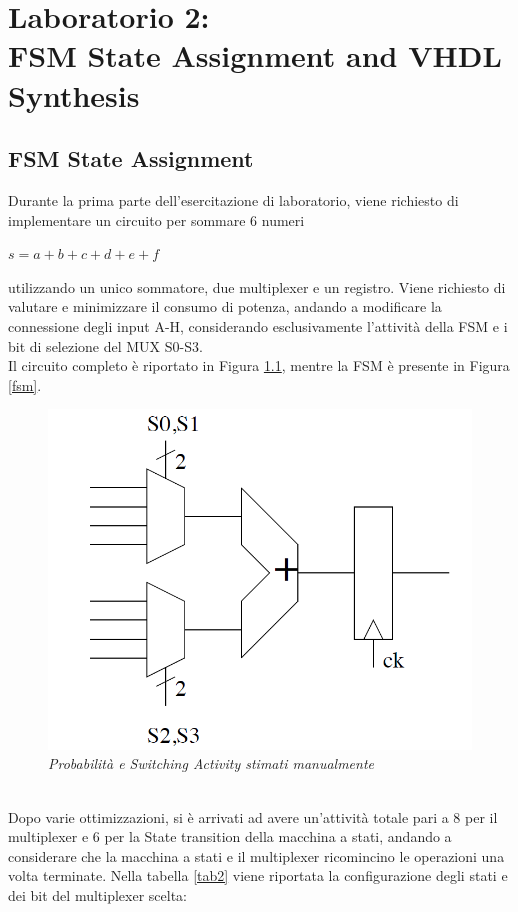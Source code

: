 \chapter{Laboratorio 2: \\FSM State Assignment and VHDL Synthesis}
\section{FSM State Assignment}
Durante la prima parte dell'esercitazione di laboratorio, viene richiesto di implementare un circuito per sommare 6 numeri
\begin{center}
	$s=a+b+c+d+e+f $
\end{center}
utilizzando un unico sommatore, due multiplexer e un registro. Viene richiesto di valutare e minimizzare il consumo di potenza, andando a modificare la connessione degli input A-H, considerando esclusivamente l'attività della FSM e i bit di selezione del MUX S0-S3.\\
Il circuito completo è riportato in Figura \ref{datapath}, mentre la FSM è presente in Figura \ref{fsm}.\\
\begin{figure}[!htb]
	\centering
	\includegraphics[scale=0.6]{immagini/circuito}
	\caption{\textit{Probabilità e Switching Activity stimati manualmente}}
	\label{datapath}
\end{figure} \\
Dopo varie ottimizzazioni, si è arrivati ad avere un'attività totale pari a 8 per il multiplexer e 6 per la State transition della macchina a stati, andando a considerare che la macchina a stati e il multiplexer ricomincino le operazioni una volta terminate. Nella tabella \ref{tab2} viene riportata la configurazione degli stati e dei bit del multiplexer scelta:
